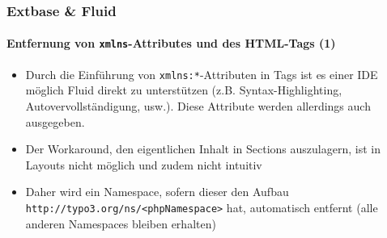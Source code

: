 
\begin{frame}[fragile]
	\frametitle{Extbase \& Fluid}
	\framesubtitle{Entfernung von \texttt{xmlns}-Attributes und des HTML-Tags (1)}

	\lstset{basicstyle=\tiny\ttfamily}

	\begin{itemize}

		\item Durch die Einführung von \texttt{xmlns:*}-Attributen in Tags ist
			es einer IDE möglich Fluid direkt zu unterstützen
			(z.B. Syntax-Highlighting, Autovervollständigung, usw.).\newline
			Diese Attribute werden allerdings auch ausgegeben.

		\item Der Workaround, den eigentlichen Inhalt in Sections auszulagern,
			ist in Layouts nicht möglich und zudem nicht intuitiv

		\item Daher wird ein Namespace, sofern dieser den Aufbau
			\small\texttt{http://typo3.org/ns/<phpNamespace>}\space\normalsize
			hat, automatisch entfernt (alle anderen Namespaces bleiben erhalten)

	\end{itemize}

\end{frame}


